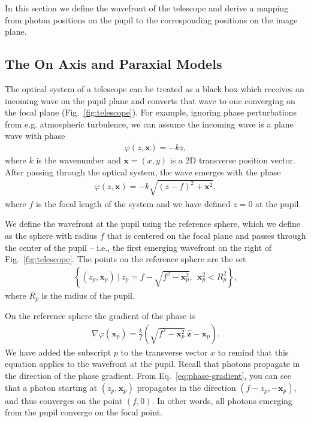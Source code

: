 \documentclass[TS,authoryear,toc]{lsstdoc}
\begin{document}
In this section we define the wavefront of the telescope and derive a mapping from photon positions on the pupil to the corresponding positions on the image plane.

\subsection{The On Axis and Paraxial Models}

The optical system of a telescope can be treated as a black box which receives an incoming wave on the pupil plane and converts that wave to one converging on the focal plane (Fig.~\ref{fig:telescope}).
For example, ignoring phase perturbations from e.g. atmospheric turbulence, we can assume the incoming wave is a plane wave with phase
\begin{align}
    \varphi(z, \mathbf{x}) = -k z,
\end{align}
where $k$ is the wavenumber and $\mathbf{x} = (x, y)$ is a 2D transverse position vector.
After passing through the optical system, the wave emerges with the phase
\begin{align}
    \varphi(z, \mathbf{x}) = -k \sqrt{(z - f)^2 + \mathbf{x}^2},
\end{align}
where $f$ is the focal length of the system and we have defined $z=0$ at the pupil.

We define the wavefront at the pupil using the reference sphere, which we define as the sphere with radius $f$ that is centered on the focal plane and passes through the center of the pupil -- i.e., the first emerging wavefront on the right of Fig.~\ref{fig:telescope}.
The points on the reference sphere are the set
\begin{align}
  \left\{ 
    (z_p, \mathbf{x}_p) ~ \vert ~
    z_p = f - \sqrt{f^2 - \mathbf{x}_p^2}, ~~
    \mathbf{x}_p^2 < R_p^2
  \right\},
\end{align}
where $R_p$ is the radius of the pupil.

On the reference sphere the gradient of the phase is
\begin{align}
    \nabla \varphi(\mathbf{x}_p)
    = \frac{k}{f} \left( \sqrt{f^2 - \mathbf{x}_p^2} ~ \hat{\mathbf{z}} -\mathbf{x}_p \right).
    \label{eq:phase-gradient}
\end{align}
We have added the subscript $p$ to the transverse vector $x$ to remind that this equation applies to the wavefront at the pupil.
Recall that photons propagate in the direction of the phase gradient.
From Eq.~\ref{eq:phase-gradient}, you can see that a photon starting at $(z_p, \mathbf{x}_p)$ propagates in the direction $(f - z_p, -\mathbf{x}_p)$, and thus converges on the point $(f, 0)$.
In other words, all photons emerging from the pupil converge on the focal point.
\end{document}

